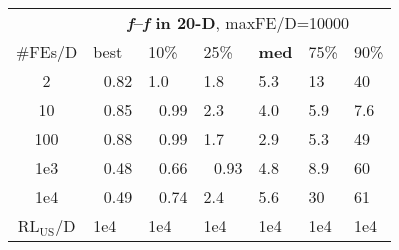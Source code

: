 \begin{tabular}{c|llllll}
 & \multicolumn{6}{|c}{\textbf{\textit{f}\raisebox{-0.35ex}{1}--\textit{f}\raisebox{-0.35ex}{24} in 20-D}, maxFE/D=10000}\\
\#FEs/D & best & 10\% & 25\% & \textbf{med} & 75\% & 90\%\\
2 & ~\,0.82 & \hspace*{1ex}1.0 & \hspace*{1ex}1.8 & \hspace*{1ex}5.3 & 13 & 40\\
10 & ~\,0.85 & ~\,0.99 & \hspace*{1ex}2.3 & \hspace*{1ex}4.0 & \hspace*{1ex}5.9 & \hspace*{1ex}7.6\\
100 & ~\,0.88 & ~\,0.99 & \hspace*{1ex}1.7 & \hspace*{1ex}2.9 & \hspace*{1ex}5.3 & 49\\
1e3 & ~\,0.48 & ~\,0.66 & ~\,0.93 & \hspace*{1ex}4.8 & \hspace*{1ex}8.9 & 60\\
1e4 & ~\,0.49 & ~\,0.74 & \hspace*{1ex}2.4 & \hspace*{1ex}5.6 & 30 & 61\\
$\text{RL}_{\text{US}}$/D & 1e4 & 1e4 & 1e4 & 1e4 & 1e4 & 1e4
\end{tabular}

